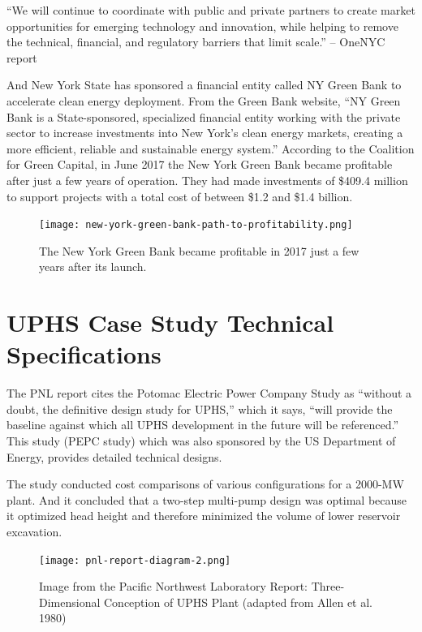 \documentclass[hidelinks,12pt,a4paper]{article}
\begin{document}
\begin{displayquote}
“We will continue to coordinate with public and private partners to create market opportunities for emerging technology and innovation, while helping to remove the technical, financial, and regulatory barriers that limit scale.” \cite{OneNYC2050FullReport} -- OneNYC report
\end{displayquote}

And New York State has sponsored a financial entity called NY Green Bank to accelerate clean energy deployment. From the Green Bank website, “NY Green Bank is a State-sponsored, specialized financial entity working with the private sector to increase investments into New York’s clean energy markets, creating a more efficient, reliable and sustainable energy system.” \cite{NYGreenBank} According to the Coalition for Green Capital, in June 2017 the New York Green Bank became profitable after just a few years of operation. They had made investments of \$409.4 million to support projects with a total cost of between \$1.2 and \$1.4 billion. \cite{NYGreenBankPathToProfitability}

\begin{figure}[ht!]
    \centering
    \texttt{[image: new-york-green-bank-path-to-profitability.png]}
    \caption{The New York Green Bank became profitable in 2017 just a few years after its launch. \cite{NYGreenBankPathToProfitability}}
\end{figure}
\FloatBarrier

\pagebreak[4]
\section{UPHS Case Study Technical Specifications}

The PNL report cites the Potomac Electric Power Company Study as
“without a doubt, the definitive design study for UPHS,” which it says, “will provide the baseline against which all UPHS development in the future will be referenced.” This study (PEPC study) which was also sponsored by the US Department of Energy, provides detailed technical designs.

The study conducted cost comparisons of various configurations for a 2000-MW plant. And it concluded that a two-step multi-pump design was optimal because it optimized head height and therefore minimized the volume of lower reservoir excavation. \cite{UndergroundPumpedHydroelectricStorage}


\begin{figure}[ht!]
    \centering
    \texttt{[image: pnl-report-diagram-2.png]}
    \caption{Image from the Pacific Northwest Laboratory Report: Three-Dimensional Conception of UPHS Plant (adapted from Allen et al. 1980) \cite{UndergroundPumpedHydroelectricStorage}}
\end{figure}
\FloatBarrier
\end{document}
